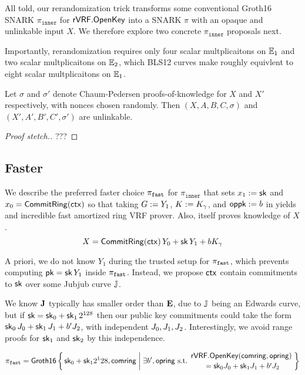 All told, our rerandomization trick transforms some conventional
Groth16 SNARK $\pi_{\mathtt{inner}}$ for ${\mathsf{rVRF}}.{\mathsf{OpenKey}}$
into a SNARK $\pi$ with an opaque and unlinkable input $X$.
We therefore explore two concrete $\pi_{\mathtt{inner}}$ proposals next.

Importantly, rerandomization requires only
 four scalar multplicaitons on ${\mathbb{E}}_1$ and
 two scalar multplicaitons on ${\mathbb{E}}_2$,
which  BLS12 curves make roughly equivlent to
 eight scalar multplicaitons on ${\mathbb{E}}_1$.


\begin{proposition}\label{prop:unlinkable}
Let $\sigma$ and $\sigma'$ denote Chaum-Pedersen proofs-of-knowledge
 for $X$ and $X'$ respectively, with nonces chosen randomly.
Then $(X,A,B,C,\sigma)$ and $(X',A',B',C',\sigma')$ are unlinkable.
\end{proposition}

\begin{proof}[Proof stetch.]
???
\end{proof}

\subsection{Faster}
\label{subsec:rvrf_faster}

We describe the preferred faster choice $\pi_{\mathtt{fast}}$ for $\pi_{\mathtt{inner}}$
that sets $x_1 := \mathsf{sk}$ and $x_0 = {\mathsf{CommitRing}}(\mathsf{ctx})$ so that
taking $G := Y_1$, $K := K_\gamma$, and $\mathsf{oppk} := b$ in \PedVRF
yields and incredible fast amortized ring VRF prover.
Also, \PedVRF itself proves knowledge of $X$.
$$ X = {\mathsf{CommitRing}}(\mathsf{ctx})\, Y_0 + \mathsf{sk}\, Y_1 + b K_\gamma $$

A priori, we do not know $Y_1$ during the trusted setup for $\pi_{\mathtt{fast}}$,
which prevents computing $\mathsf{pk} = \mathsf{sk}\, Y_1$ inside $\pi_{\mathtt{fast}}$.
Instead, we propose $\mathsf{ctx}$ contain commitments to $\mathsf{sk}$ over
some Jubjub curve ${\mathbb{J}}$.  

We know ${\mathbf{J}}$ typically has smaller order than ${\mathbf{E}}$,
due to ${\mathbb{J}}$ being an Edwards curve, but 
if $\mathsf{sk} = \mathsf{sk}_0 + \mathsf{sk}_1 \, 2^{128}$ then our public key commitments could
take the form $\mathsf{sk}_0\, J_0 + \mathsf{sk}_1\, J_1 + b' J_2$,
with independent $J_0,J_1,J_2$.
Interestingly, we avoid range proofs for $\mathsf{sk}_1$ and $\mathsf{sk}_2$
by this independence. 

$$ \pifast = \rrSNARK \Setst{ \sk_0 + \sk_1 2^128, \comring }{
 \exists b',\openring \textrm{\ s.t.\ }
 \genfrac{}{}{0pt}{}{\rVRF.\OpenKey(\comring,\openring)}{\,\, = \sk_0 \genJ_0 + \sk_1 \genJ_1 + b' \genJ_2}
} $$ %

